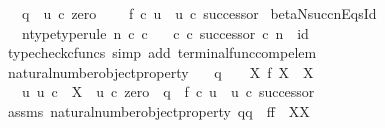 \begin{isabellebody}
\ \ \ q\ {\isacharequal}{\kern0pt}\ u\ {\isasymcirc}\isactrlsub c\ zero\ {\isasymand}\isanewline
\ \ \ f\ {\isasymcirc}\isactrlsub c\ u\ {\isacharequal}{\kern0pt}\ u\ {\isasymcirc}\isactrlsub c\ successor{\isacharparenright}{\kern0pt}{\isachardoublequoteclose}\isanewline
\isanewline
{}\isamarkupfalse%
\ beta{\isacharunderscore}{\kern0pt}N{\isacharunderscore}{\kern0pt}succ{\isacharunderscore}{\kern0pt}nEqs{\isacharunderscore}{\kern0pt}Id{}{\isacharcolon}{\kern0pt}\isanewline
\ \ \ n{\isacharunderscore}{\kern0pt}type{\isacharbrackleft}{\kern0pt}type{\isacharunderscore}{\kern0pt}rule{\isacharbrackright}{\kern0pt}{\isacharcolon}{\kern0pt}\ {\isachardoublequoteopen}n\ {\isasymin}\isactrlsub c\ {\isasymnat}\isactrlsub c{\isachardoublequoteclose}\isanewline
\ \ \ {\isachardoublequoteopen}{\isasymbeta}\isactrlbsub {\isasymnat}\isactrlsub c\isactrlesub \ {\isasymcirc}\isactrlsub c\ successor\ {\isasymcirc}\isactrlsub c\ n\ {\isacharequal}{\kern0pt}\ id\ {\isasymone}{\isachardoublequoteclose}\isanewline
%
\isadelimproof
\ \ %
\endisadelimproof
%
\isatagproof
{}\isamarkupfalse%
\ {\isacharparenleft}{\kern0pt}typecheck{\isacharunderscore}{\kern0pt}cfuncs{\isacharcomma}{\kern0pt}\ simp\ add{\isacharcolon}{\kern0pt}\ terminal{\isacharunderscore}{\kern0pt}func{\isacharunderscore}{\kern0pt}comp{\isacharunderscore}{\kern0pt}elem{\isacharparenright}{\kern0pt}%
\endisatagproof
{\isafoldproof}%
%
\isadelimproof
\isanewline
%
\endisadelimproof
\isanewline
{}\isamarkupfalse%
\ natural{\isacharunderscore}{\kern0pt}number{\isacharunderscore}{\kern0pt}object{\isacharunderscore}{\kern0pt}property{}{\isacharcolon}{\kern0pt}\isanewline
\ \ \ {\isachardoublequoteopen}q\ {\isacharcolon}{\kern0pt}\ {\isasymone}\ {\isasymrightarrow}\ X{\isachardoublequoteclose}\ {\isachardoublequoteopen}f{\isacharcolon}{\kern0pt}\ X\ {\isasymrightarrow}\ X{\isachardoublequoteclose}\isanewline
\ \ \ {\isachardoublequoteopen}{\isasymexists}{\isacharbang}{\kern0pt}u{\isachardot}{\kern0pt}\ u{\isacharcolon}{\kern0pt}\ {\isasymnat}\isactrlsub c\ {\isasymrightarrow}\ X\ {\isasymand}\ u\ {\isasymcirc}\isactrlsub c\ zero\ {\isacharequal}{\kern0pt}\ q\ {\isasymand}\ f\ {\isasymcirc}\isactrlsub c\ u\ {\isacharequal}{\kern0pt}\ u\ {\isasymcirc}\isactrlsub c\ successor{\isachardoublequoteclose}\isanewline
%
\isadelimproof
\ \ %
\endisadelimproof
%
\isatagproof
{}\isamarkupfalse%
\ assms\ natural{\isacharunderscore}{\kern0pt}number{\isacharunderscore}{\kern0pt}object{\isacharunderscore}{\kern0pt}property{\isacharbrackleft}{\kern0pt}\ q{\isacharequal}{\kern0pt}q{\isacharcomma}{\kern0pt}\ \ f{\isacharequal}{\kern0pt}f{\isacharcomma}{\kern0pt}\ \ X{\isacharequal}{\kern0pt}X{\isacharbrackright}{\kern0pt}\isanewline

\end{isabellebody}
